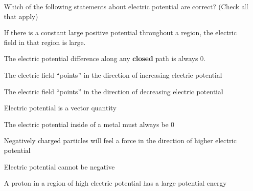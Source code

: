 \question[10] Which of the following statements about electric potential are correct? (Check all that apply)
\begin{todolist}
	\item If there is a constant large positive potential throughout a region, the electric field in that region is large.
	\item The electric potential difference along any \textbf{closed} path is always 0.
	\item The electric field ``points'' in the direction of increasing electric potential
	\item The electric field ``points'' in the direction of decreasing electric potential	
	\item Electric potential is a vector quantity
	\item The electric potential inside of a metal must always be 0
	\item Negatively charged particles will feel a force in the direction of higher electric potential
	\item Electric potential cannot be negative
	\item A proton in a region of high electric potential has a large potential energy
\end{todolist}